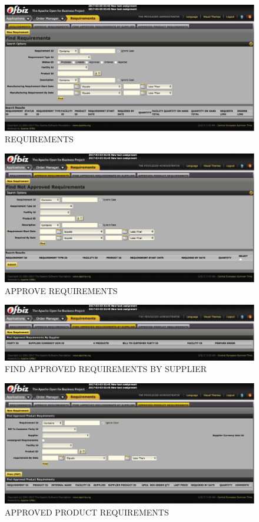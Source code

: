 \documentclass[a4paper,11pt]{article}
\begin{document}
	\begin{figure}[H]
   			\centering
  			\includegraphics[width=\textwidth]{images/requirement}
  	    		\caption{REQUIREMENTS}\label{fig-req1}
		\end{figure}
	\begin{figure}[H]
   			\centering
  			\includegraphics[width=\textwidth]{images/requirement2}
  	    		\caption{APPROVE REQUIREMENTS}\label{fig-req2}
		\end{figure}
	\begin{figure}[H]
   			\centering
  			\includegraphics[width=\textwidth]{images/requirement3}
  	    		\caption{FIND APPROVED REQUIREMENTS BY SUPPLIER}\label{fig-req3}
		\end{figure}
	\begin{figure}[H]
   			\centering
  			\includegraphics[width=\textwidth]{images/requirement4}
  	    		\caption{APPROVED PRODUCT REQUIREMENTS}\label{fig-req4}
		\end{figure}
\end{document}
